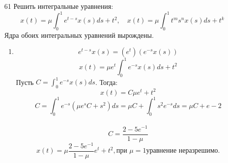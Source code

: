 \documentclass[a4paper, 12pt]{report}
\theoremstyle{definition}
\theoremstyle{remark}
\begin{document}
\begin{large}
\begin{enumerate}



    
    \item[61] Решить интегральные уравнения:
    \[x(t) = \mu \int_0^1 e^{t-s} x(s) ds + t^2, \quad x(t) = \mu \int_0^1 t^m s^n x(s) ds + t^k\]
    Ядра обоих интегральных уравнений вырождены.
    \begin{enumerate}
        \item \[e^{t-s}x(s) = (e^t)(e^{-s}x(s))\]
        \[x(t) = \mu e^t\int_0^1 e^{-s}x(s) ds + t^2\]
        Пусть $C = \int_0^1 e^{-s}x(s) ds$. Тогда:
        \[x(t) = C\mu e^t + t^2\]
        \[C = \int_0^1 e^{-s} (\mu e^s C+s^2)ds = \mu C + \int_0^1 s^2e^{-s}ds =  \mu C + e - 2\]\
        \[C = \frac{2-5e^{-1}}{1-\mu}\]
        \[x(t) = \mu \frac{2-5e^{-1}}{1-\mu} e^t + t^2, \text{при } \mu = 1\text{уравнение неразрешимо.}\]
    

\end{enumerate}
\end{enumerate}
\end{large}
\end{document}

